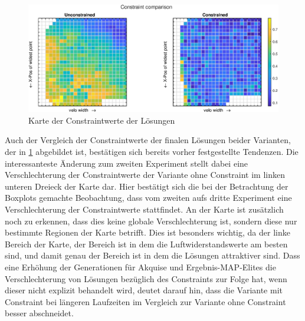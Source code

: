 \begin{figure}[h]
	\includegraphics[width=1\linewidth]{bilder/6pt1000Samples/constraintMapComparison}
	\caption{Karte der Constraintwerte der Lösungen}
	\label{fig:3rdmapCon}
\end{figure}

Auch der Vergleich der Constraintwerte der finalen Lösungen beider Varianten,  der in \cref{fig:3rdmapCon} abgebildet ist, bestätigen sich bereits vorher festgestellte Tendenzen.
Die interessanteste Änderung zum zweiten Experiment stellt dabei eine Verschlechterung der Constraintwerte der Variante ohne Constraint im linken unteren Dreieck der Karte dar.
Hier bestätigt sich die bei der Betrachtung der Boxplots gemachte Beobachtung, dass vom zweiten aufs dritte Experiment eine Verschlechterung der Constraintwerte stattfindet.
An der Karte ist zusätzlich noch zu erkennen, dass dies keine globale Verschlechterung ist, sondern diese nur bestimmte Regionen der Karte betrifft.
Dies ist besonders wichtig, da der linke Bereich der Karte, der Bereich ist in dem die Luftwiderstandswerte am besten sind, und damit genau der Bereich ist in dem die Lösungen attraktiver sind.
Dass eine Erhöhung der Generationen für Akquise und Ergebnis-MAP-Elites die Verschlechterung von Lösungen bezüglich des Constraints zur Folge hat, wenn dieser nicht explizit behandelt wird, deutet darauf hin, dass die Variante mit Constraint bei längeren Laufzeiten im Vergleich zur Variante ohne Constraint besser abschneidet. 

